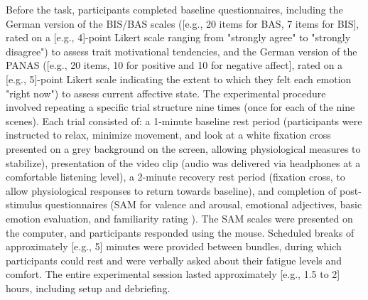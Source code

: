 Before the task, participants completed baseline questionnaires, including the German version of the \gls{BIS}/\gls{BAS} scales ([e.g., 20 items for BAS, 7 items for BIS], rated on a [e.g., 4]-point Likert scale ranging from "strongly agree" to "strongly disagree") \parencite{carverBehavioralInhibitionBehavioral1994, strobelDeutschsprachigeVersionBIS2006} to assess trait motivational tendencies, and the German version of the \gls{PANAS} ([e.g., 20 items, 10 for positive and 10 for negative affect], rated on a [e.g., 5]-point Likert scale indicating the extent to which they felt each emotion "right now") \parencite{watsonDevelopmentValidationBrief1988,breyerDeutscheVersionPositive2016} to assess current affective state. The experimental procedure involved repeating a specific trial structure nine times (once for each of the nine scenes). Each trial consisted of: a 1-minute baseline rest period (participants were instructed to relax, minimize movement, and look at a white fixation cross presented on a grey background on the screen, allowing physiological measures to stabilize), presentation of the video clip (audio was delivered via headphones at a comfortable listening level), a 2-minute recovery rest period (fixation cross, to allow physiological responses to return towards baseline), and completion of post-stimulus questionnaires (\gls{SAM} for valence and arousal, emotional adjectives, basic emotion evaluation, and familiarity rating \parencite{maffeiEMOVIEExperimentalMOVies2019}). The \gls{SAM} scales were presented on the computer, and participants responded using the mouse. Scheduled breaks of approximately [e.g., 5] minutes were provided between bundles, during which participants could rest and were verbally asked about their fatigue levels and comfort. The entire experimental session lasted approximately [e.g., 1.5 to 2] hours, including setup and debriefing.

